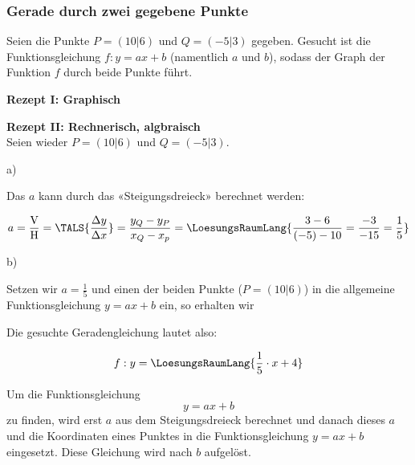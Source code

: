 \subsubsection{Gerade durch zwei gegebene Punkte}

Seien die Punkte $P=(10|6)$ und $Q=(-5|3)$ gegeben.
Gesucht ist die Funktionsgleichung $f: y=ax+b$ (namentlich $a$ und $b$), sodass
der Graph der Funktion $f$ durch beide Punkte führt.


\textbf{Rezept I: Graphisch}\\

\vspace{1mm}




\newpage

\textbf{Rezept II: Rechnerisch, algbraisch }\\

Seien wieder $P=(10|6)$ und $Q=(-5|3)$.
\vspace{1mm}

a)

Das $a$ kann durch das «Steigungsdreieck» berechnet werden:

$$a = \frac{\text{V}}{\text{H}}=\TALS{\frac{\Delta y}{\Delta x}}=\frac{y_Q-y_P}{x_Q-x_p} = \LoesungsRaumLang{\frac{3 - 6}{(-5) - 10} = \frac{-3}{-15} = \frac{1}{5}}$$

b)

Setzen wir $a=\frac{1}{5}$ und einen der beiden Punkte (\zB $P=(10|6)$) in die
allgemeine Funktionsgleichung $y=ax+b$ ein, so erhalten wir


Die gesuchte Geradengleichung lautet also:

$$f: y=\LoesungsRaumLang{\frac{1}{5}\cdot{}x + 4}$$

\begin{rezept}{}{}
Um die Funktionsgleichung $$y=ax+b$$ zu finden,
  wird erst $a$ aus dem Steigungsdreieck berechnet und danach dieses
  $a$ und die Koordinaten eines Punktes in die Funktionsgleichung
  $y=ax+b$ eingesetzt. Diese Gleichung wird nach $b$ aufgelöst.
\end{rezept}
\newpage

